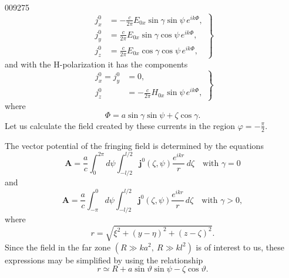 \begin{scanpage}{0092}{75}
\[
\left.\begin{aligned}
j_x^0&=-\frac c{2\pi}E_{0x}\sin\gamma\sin\psi\,e^{ik\Phi},\\
j_y^0&=\frac c{2\pi}E_{0x}\sin\gamma\cos\psi\,e^{ik\Phi},\\
j_z^0&=\frac c{2\pi}E_{0x}\cos\gamma\cos\psi\,e^{ik\Phi},
\end{aligned}\right\}\tag{13.02}
\]
and with the H-polarization it has the components
\[\left.\begin{aligned}j_x^0=j_y^0&=0,\\j_z^0&=-\frac c{2\pi}H_{0x}\sin\psi\,e^{ik\Phi},\end{aligned}\right\}\tag{13.03}\]
where
\[\Phi=a\sin\gamma\sin\psi+\zeta\cos\gamma.\tag{13.04}\]
Let us calculate the field created by these currents in the region $\varphi=-\frac\pi2$.

The vector potential of the fringing field is determined by the equations
\[\mathbf A=\frac ac\int_0^{2\pi}d\psi\int_{-l/2}^{l/2}\mathbf j^0(\zeta,\psi)\frac{e^{ikr}}r\,d\zeta\quad\text{with }\gamma=0\tag{13.05}\]
and
\[\mathbf A=\frac ac\int_{-\pi}^0d\psi\int_{-l/2}^{l/2}\mathbf j^0(\zeta,\psi)\frac{e^{ikr}}r\,d\zeta\quad\text{with }\gamma>0,\tag{13.06}\]
where
\[r=\sqrt{\xi^2+(y-\eta)^2+(z-\zeta)^2}.\tag{13.07}\]
Since the field in the far zone $(R\gg ka^2,\ R\gg kl^2)$ is of interest to us, these expressions may be simplified by using the relationship
\[r\simeq R+a\sin\vartheta\sin\psi-\zeta\cos\vartheta.\tag{13.08}\]
\end{scanpage}
